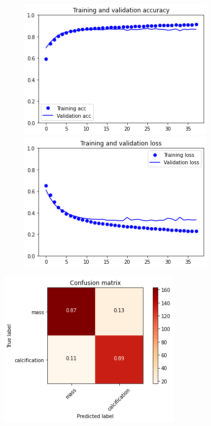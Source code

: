 \documentclass{article}
\begin{document}
\begin{figure}[h]
    \centering
    \begin{minipage}{0.45\textwidth}
        \centering
        \includegraphics[scale=0.46]{./img/preTrainVal3_ft.png}
    \end{minipage}\hfill
    \begin{minipage}{0.45\textwidth}
        \centering
        \includegraphics[scale=0.46]{./img/preTrainLoss3_ft.png}
    \end{minipage}
\end{figure}

\begin{center}
\begin{minipage}{0.45\textwidth}
        \includegraphics[scale=0.6]{./img/cmPreTrain3_ft.png}
    \end{minipage}
\end{center}
\end{document}
